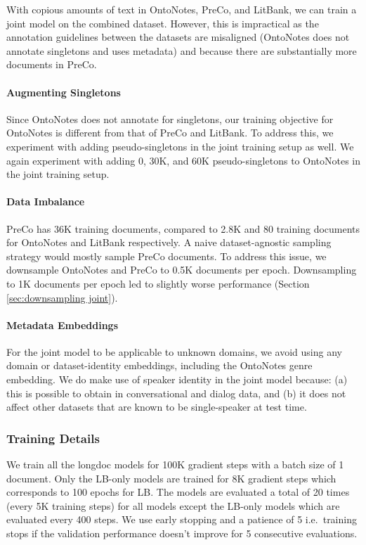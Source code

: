 \documentclass[12pt]{thesis-umich}[thesis]
\begin{document}
With copious amounts of text in OntoNotes, PreCo, and LitBank, we can train a joint model on the combined dataset. However, this is impractical as the annotation guidelines between the datasets are misaligned (OntoNotes does not annotate singletons and uses metadata) and because there are substantially more documents in PreCo. 

\paragraph{Augmenting Singletons} 
Since OntoNotes does not annotate for singletons, our training objective for OntoNotes is different from that of PreCo and LitBank. 
To address this, we experiment with adding pseudo-singletons in the joint training setup as well. We again experiment with adding 0, 30K, and 60K 
pseudo-singletons to OntoNotes in the joint training setup. 

\paragraph{Data Imbalance}
PreCo has 36K training documents, compared to 2.8K and 80 training documents for OntoNotes and 
LitBank respectively. A naive dataset-agnostic sampling strategy would mostly sample PreCo documents. To address this issue, we downsample OntoNotes and PreCo to 0.5K documents per epoch. Downsampling to 1K documents per epoch led to slightly worse performance (Section \ref{sec:downsampling joint}).  


\paragraph{Metadata Embeddings}
For the joint model to be applicable to unknown domains, we avoid using any domain or dataset-identity embeddings, including the OntoNotes genre embedding.  
We do make use of speaker identity in the joint model because: (a) this is possible to obtain in conversational and dialog data, and (b) it does not affect other datasets that are known to be single-speaker at test time. 


\subsubsection{Training Details}
We train all the longdoc models for 100K gradient steps with a batch size of 1 document. Only the LB-only models are trained for 8K gradient steps which corresponds to 100 epochs for LB. The models are evaluated a total of 20 times (every 5K training steps) for all models except the LB-only models which are evaluated every 400 steps. 
We use early stopping and a patience of 5 i.e.\ training stops if the validation performance doesn't improve for 5 consecutive evaluations. 
\end{document}
